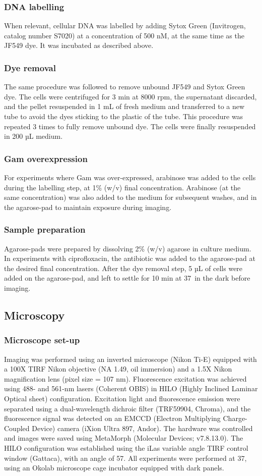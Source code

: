 \subsubsection*{DNA labelling}
When relevant, cellular DNA was labelled by adding Sytox Green (Invitrogen, catalog number S7020) at a concentration of 500 nM, at the same time as the JF549 dye. It was incubated as described above.
\subsubsection*{Dye removal}
The same procedure was followed to remove unbound JF549 and Sytox Green dye. The cells were centrifuged for 3 min at 8000 rpm, the supernatant discarded, and the pellet resuspended in 1 mL of fresh medium and transferred to a new tube to avoid the dyes sticking to the plastic of the tube. This procedure was repeated 3 times to fully remove unbound dye. The cells were finally resuspended in 200 µL medium.
\subsubsection*{Gam overexpression}
For experiments where Gam was over-expressed, arabinose was added to the cells during the labelling step, at 1\% (w/v) final concentration. Arabinose (at the same concentration) was also added to the medium for subsequent washes, and in the agarose-pad to maintain exposure during imaging.
\subsubsection*{Sample preparation}
Agarose-pads were prepared by dissolving 2\% (w/v) agarose in culture medium. In experiments with ciprofloxacin, the antibiotic was added to the agarose-pad at the desired final concentration. After the dye removal step, 5 µL of cells were added on the agarose-pad, and left to settle for 10 min at 37\celsius\ in the dark before imaging.

\subsection*{Microscopy}
\subsubsection*{Microscope set-up}
Imaging was performed using an inverted microscope (Nikon Ti-E) equipped with a 100X TIRF Nikon objective (NA 1.49, oil immersion) and a 1.5X Nikon magnification lens (pixel size = 107 nm). Fluorescence excitation was achieved using 488- and 561-nm lasers (Coherent OBIS) in HILO (Highly Inclined Laminar Optical sheet) configuration. Excitation light and fluorescence emission were separated using a dual-wavelength dichroic filter (TRF59904, Chroma), and the fluorescence signal was detected on an EMCCD (Electron Multiplying Charge-Coupled Device) camera (iXion Ultra 897, Andor). The hardware was controlled and images were saved using MetaMorph (Molecular Devices; v7.8.13.0). The HILO configuration was established using the iLas variable angle TIRF control window (Gattaca), with an angle of 57\degree. All experiments were performed at 37\celsius, using an Okolab microscope cage incubator equipped with dark panels.

